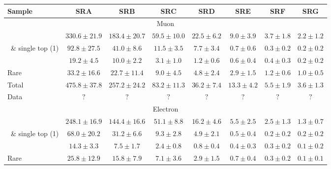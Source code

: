
	\begin{table}[!h]																															
	\begin{center}																															
	{\footnotesize																															
	\begin{tabular}{l||c|c|c|c|c|c|c}																															
	\hline																															
	Sample		&	SRA			&	SRB			&	SRC			&	SRD			&	SRE			&	SRF			&	SRG\\				
	\hline																															
	\hline																															
	\multicolumn{8}{c}{Muon}	\\																														
	\hline																															
	\ttdl\  		&$	330.6	\pm	21.9	$&$	183.4	\pm	20.7	$&$	59.5	\pm	10.0	$&$	22.5	\pm	6.2	$&$	9.0	\pm	3.9	$&$	3.7	\pm	1.8	$&$	2.2	\pm	1.2	$	\\
	\ttsl\ \& single top (1\Lep) 		&$	92.8	\pm	27.5	$&$	41.0	\pm	8.6	$&$	11.5	\pm	3.5	$&$	7.7	\pm	3.4	$&$	0.7	\pm	0.6	$&$	0.3	\pm	0.2	$&$	0.2	\pm	0.2	$	\\
	\wjets\ 		&$	19.2	\pm	4.5	$&$	10.0	\pm	2.2	$&$	3.1	\pm	1.0	$&$	1.2	\pm	0.6	$&$	0.6	\pm	0.4	$&$	0.4	\pm	0.3	$&$	0.2	\pm	0.2	$	\\
	Rare 		&$	33.2	\pm	16.6	$&$	22.7	\pm	11.4	$&$	9.0	\pm	4.5	$&$	4.8	\pm	2.4	$&$	2.9	\pm	1.5	$&$	1.2	\pm	0.6	$&$	1.0	\pm	0.5	$	\\
	\hline																															
	Total 		&$	475.8	\pm	37.8	$&$	257.2	\pm	24.2	$&$	83.2	\pm	11.3	$&$	36.2	\pm	7.4	$&$	13.3	\pm	4.2	$&$	5.5	\pm	1.9	$&$	3.6	\pm	1.3	$	\\
	\hline																															
	\hline																															
	Data 		&$	?			$&$	?			$&$	?			$&$	?			$&$	?			$&$	?			$&$	?			$	\\
	\hline																															
	\hline																															
	\hline																															
	\multicolumn{8}{c}{Electron}	\\																														
	\hline																															
	\ttdl\  		&$	248.1	\pm	16.9	$&$	144.4	\pm	16.6	$&$	51.1	\pm	8.8	$&$	16.2	\pm	4.6	$&$	5.5	\pm	2.5	$&$	2.5	\pm	1.3	$&$	1.3	\pm	0.7	$	\\
	\ttsl\ \& single top (1\Lep) 		&$	68.0	\pm	20.2	$&$	31.2	\pm	6.6	$&$	9.3	\pm	2.8	$&$	4.9	\pm	2.1	$&$	0.5	\pm	0.4	$&$	0.2	\pm	0.2	$&$	0.2	\pm	0.2	$	\\
	\wjets\ 		&$	14.3	\pm	3.3	$&$	7.5	\pm	1.7	$&$	2.4	\pm	0.8	$&$	0.8	\pm	0.4	$&$	0.4	\pm	0.3	$&$	0.3	\pm	0.2	$&$	0.1	\pm	0.2	$	\\
	Rare 		&$	25.8	\pm	12.9	$&$	15.8	\pm	7.9	$&$	7.1	\pm	3.6	$&$	2.9	\pm	1.5	$&$	0.7	\pm	0.4	$&$	0.3	\pm	0.2	$&$	0.1	\pm	0.1	$	\\

\end{tabular}}
\end{center}
\end{table}
